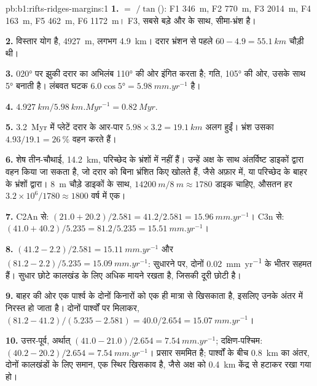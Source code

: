 \begin{solution}{pb:b1:rifts-ridges-margins:1}
\textbf{1.}  $= $ $/\tan$(): F1 \qty{346}{m}, F2 \qty{770}{m}, F3 \qty{2014}{m}, F4 \qty{163}{m}, F5 \qty{462}{m}, F6 \qty{1172}{m}। F3, सबसे बड़े  और  के साथ, सीमा-भ्रंश है।

\textbf{2.} विस्तार योग है, \qty{4927}{m}, लगभग \qty{4.9}{km}। दरार भ्रंशन से पहले $60 - 4.9 = \qty{55.1}{km}$ चौड़ी थी।

\textbf{3.} \ang{020} पर झुकी दरार का अभिलंब \ang{110} की ओर इंगित करता है; गति, \ang{105} की ओर, उसके साथ \ang{5} बनाती है। लंबवत घटक $6.0\cos\ang{5} = \qty{5.98}{mm.yr^{-1}}$ है।

\textbf{4.} $\qty{4.927}{km}/\qty{5.98}{km.Myr^{-1}} = \qty{0.82}{Myr}$.

\textbf{5.} \qty{3.2}{Myr} में प्लेटें दरार के आर-पार $5.98\times3.2 = \qty{19.1}{km}$ अलग हुईं। भ्रंश उसका $4.93/19.1 = \qty{26}{\percent}$ वहन करते हैं।

\textbf{6.} शेष तीन-चौथाई, \qty{14.2}{km}, परिच्छेद के भ्रंशों में नहीं हैं। उन्हें अक्ष के साथ अंतर्विष्ट डाइकों द्वारा वहन किया जा सकता है, जो दरार को बिना भ्रंशित किए खोलते हैं, जैसे अफ़ार में, या परिच्छेद के बाहर के भ्रंशों द्वारा। \qty{8}{m} चौड़े डाइकों के साथ, $\qty{14200}{m}/\qty{8}{m} \approx 1780$ डाइक चाहिए, औसतन हर $3.2\times10^6/1780 \approx 1800$ वर्ष में एक।

\textbf{7.} C2An से: $(21.0 + 20.2)/2.581 = 41.2/2.581 =
\qty{15.96}{mm.yr^{-1}}$। C3n से: $(41.0 + 40.2)/5.235 = 81.2/5.235 =
\qty{15.51}{mm.yr^{-1}}$।

\textbf{8.} $(41.2 - 2.2)/2.581 = \qty{15.11}{mm.yr^{-1}}$ और
$(81.2 - 2.2)/5.235 = \qty{15.09}{mm.yr^{-1}}$: सुधारने पर, दोनों \qty{0.02}{mm.yr^{-1}} के भीतर सहमत हैं। सुधार छोटे कालखंड के लिए अधिक मायने रखता है, जिसकी दूरी छोटी है।

\textbf{9.} बाहर की ओर  एक पार्श्व के दोनों किनारों को एक ही मात्रा से खिसकाता है, इसलिए उनके अंतर में निरस्त हो जाता है। दोनों पार्श्वों पर मिलाकर,
$(81.2 - 41.2)/(5.235 - 2.581) = 40.0/2.654 = \qty{15.07}{mm.yr^{-1}}$।

\textbf{10.} उत्तर-पूर्व, अर्थात् $(41.0 - 21.0)/2.654 = \qty{7.54}{mm.yr^{-1}}$; दक्षिण-पश्चिम: $(40.2 - 20.2)/2.654 = \qty{7.54}{mm.yr^{-1}}$। प्रसार सममित है; पार्श्वों के बीच \qty{0.8}{km} का अंतर, दोनों कालखंडों के लिए समान, एक स्थिर खिसकाव है, जैसे अक्ष को \qty{0.4}{km} केंद्र से हटाकर रखा गया हो।


\end{solution}
